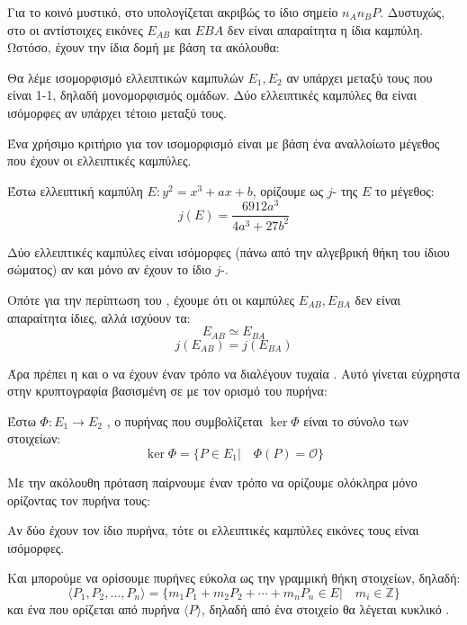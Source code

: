 \documentclass[oneside,a4paper]{article}
\begin{document}
Για το κοινό μυστικό, στο  υπολογίζεται ακριβώς το ίδιο σημείο $n_A n_B P$. Δυστυχώς, στο  οι αντίστοιχες εικόνες $E_{AB}$ και $E{BA}$ δεν είναι απαραίτητα η ίδια καμπύλη. Ωστόσο, έχουν την ίδια δομή με βάση τα ακόλουθα:

\begin{defn}[Ισομορφισμός] Θα λέμε ισομορφισμό ελλειπτικών καμπυλών $E_1,E_2$ αν υπάρχει  μεταξύ τους που είναι 1-1, δηλαδή μονομορφισμός ομάδων. Δύο ελλειπτικές καμπύλες θα είναι ισόμορφες αν υπάρχει τέτοιο  μεταξύ τους.
\end{defn}

Ένα χρήσιμο κριτήριο για τον ισομορφισμό είναι με βάση ένα αναλλοίωτο μέγεθος που έχουν οι ελλειπτικές καμπύλες.

\begin{defn}[$j$-\tl{invariant}]
	Έστω ελλειπτική καμπύλη $E: y^2 = x^3 + ax + b$, ορίζουμε ως $j$- της $E$ το μέγεθος:
	$$j(E) = \frac{6912 a^3}{4a^3 + 27b^2}$$
\end{defn}

\begin{prop} Δύο ελλειπτικές καμπύλες είναι ισόμορφες (πάνω από την αλγεβρική θήκη του ίδιου σώματος) αν και μόνο αν έχουν το ίδιο $j$-.
\end{prop}

Οπότε για την περίπτωση του , έχουμε ότι οι καμπύλες $E_{AB}, E_{BA}$ δεν είναι απαραίτητα ίδιες, αλλά ισχύουν τα:
$$E_{AB} \simeq E_{BA}$$
$$j(E_{AB}) = j(E_{BA})$$

Άρα πρέπει η  και ο  να έχουν έναν τρόπο να διαλέγουν τυχαία . Αυτό γίνεται εύχρηστα στην κρυπτογραφία βασισμένη σε  με τον ορισμό του πυρήνα:

\begin{defn}
	Έστω $\Phi : E_1 \longrightarrow E_2$ , ο πυρήνας που συμβολίζεται $\ker \Phi$ είναι το σύνολο των στοιχείων:
	$$\ker \Phi = \{P \in E_1 | \quad \Phi(P) = \mathcal{O}\}$$
\end{defn}
Με την ακόλουθη πρόταση παίρνουμε έναν τρόπο να ορίζουμε ολόκληρα  μόνο ορίζοντας τον πυρήνα τους:

\begin{prop}
	Αν δύο  έχουν τον ίδιο πυρήνα, τότε οι ελλειπτικές καμπύλες εικόνες τους είναι ισόμορφες.
\end{prop}

Και μπορούμε να ορίσουμε πυρήνες εύκολα ως την γραμμική θήκη στοιχείων, δηλαδή:
$$\langle P_1,P_2,\ldots,P_n \rangle = \{m_1 P_1 + m_2 P_2 +\cdots + m_n P_n \in E| \quad m_i \in \mathbb{Z}\}$$ και ένα  που ορίζεται από πυρήνα $\langle P \rangle$, δηλαδή από ένα στοιχείο θα λέγεται κυκλικό . 
\end{document}
